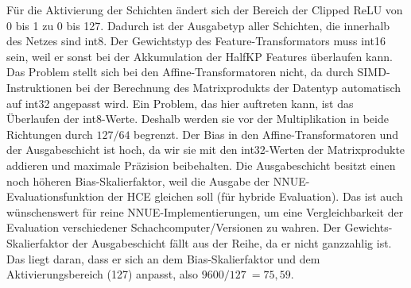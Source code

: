 \begin{table}[ht]
  \caption{Skalierfaktor und Datentypen für Gewichte und Bias des \acp{NNUE} sowie Ausgabetyp der Schichten basierend auf Werten der Stockfish \ac{NNUE}-Implementierung \cite{StockfishNNUE}}
  \label{table:netQuantization}
  \renewcommand{\arraystretch}{1.2}
  \centering
  \sffamily
  \begin{footnotesize}
  \end{footnotesize}
  \rmfamily
\end{table}

Für die Aktivierung der Schichten ändert sich der Bereich der Clipped \ac{ReLU} von 0 bis 1 zu 0 bis 127. Dadurch ist der Ausgabetyp aller Schichten, die innerhalb des Netzes sind int8. Der Gewichtstyp des Feature-Transformators muss int16 sein, weil er sonst bei der Akkumulation der HalfKP Features überlaufen kann. Das Problem stellt sich bei den Affine-Transformatoren nicht, da durch \ac{SIMD}-Instruktionen bei der Berechnung des Matrixprodukts der Datentyp automatisch auf int32 angepasst wird. Ein Problem, das hier auftreten kann, ist das Überlaufen der int8-Werte. Deshalb werden sie vor der Multiplikation in beide Richtungen durch $127/64$ begrenzt. Der Bias in den Affine-Transformatoren und der Ausgabeschicht ist hoch, da wir sie mit den int32-Werten der Matrixprodukte addieren und maximale Präzision beibehalten. Die Ausgabeschicht besitzt einen noch höheren Bias-Skalierfaktor, weil die Ausgabe der \ac{NNUE}-Evaluationsfunktion der \ac{HCE} gleichen soll (für hybride Evaluation). Das ist auch wünschenswert für reine \ac{NNUE}-Implementierungen, um eine Vergleichbarkeit der Evaluation verschiedener Schachcomputer/Versionen zu wahren. Der Gewichts-Skalierfaktor der Ausgabeschicht fällt aus der Reihe, da er nicht ganzzahlig ist. Das liegt daran, dass er sich an dem Bias-Skalierfaktor und dem Aktivierungsbereich (127) anpasst, also $9600/127~=75,59$.

